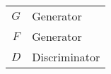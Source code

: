 
{\large
\begin{tabular}{cp{}}
  $G$ & Generator \\
  $F$ & Generator \\
  $D$ & Discriminator \\
\end{tabular}\\}